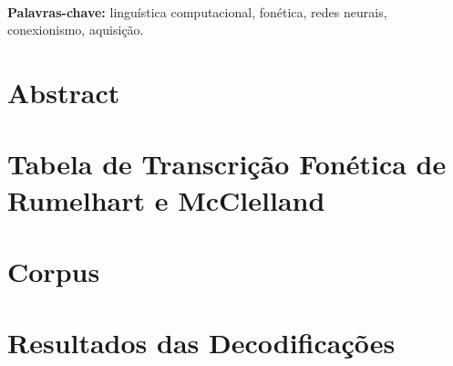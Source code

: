 \documentclass[12pt,twoside,a4paper]{book}
\renewcommand{\chaptermark}[1]{\markboth{\MakeUppercase{#1}}{}}
\begin{document}
\\
 \textbf{Palavras-chave:}
linguística computacional, fonética, redes neurais, conexionismo, aquisição.

\chapter*{Abstract}

\tableofcontents    %





\listoffigures            

\mainmatter

\fancyhead[RE,LO]{\thesection}

\onehalfspacing            %




%

%


\clearpage
\appendix
\chapter{Tabela de Transcrição Fonética de Rumelhart e McClelland}
\chapter{Corpus}
\chapter{Resultados das Decodificações}
% 





\renewcommand{\chaptermark}[1]{\markboth{\MakeUppercase{\appendixname\ \thechapter}} {\MakeUppercase{#1}} }
\fancyhead[RE,LO]{}
\appendix
\end{document}
